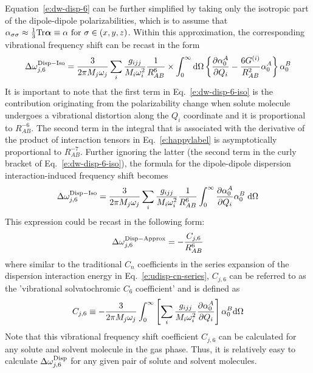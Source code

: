 \documentclass[a4paper,titlepage,twoside,fleqn,12pt]{book}
\newcommand{\BM}[1]{\ensuremath{\mbox{\boldmath${#1}$}}}
\newcommand{\fderiv}[2]{\ensuremath{
\frac{\partial #1}{\partial #2}}}
\begin{document}
\begin{refsection}
Equation~\eqref{e:dw-disp-6} can be further simplified by taking only the isotropic 
part of the dipole\hyp{}dipole polarizabilities, which is to assume that 
$\alpha_{\sigma\sigma} \approx \frac{1}{3}{\rm Tr}{\BM\alpha} \equiv \alpha \text{ for } \sigma \in (x, y, z)$. 
Within this approximation, the corresponding vibrational frequency shift 
can be recast in the form
%
\begin{equation} \label{e:dw-disp-6-iso}
\Delta \omega_{j,6}^{\rm Disp-Iso} = \frac{3}{2\pi M_j\omega_j}
\sum_i \frac{g_{ijj}}{M_i\omega_i^2} 
\frac{1}{R^6_{AB}} \times
\int_{0}^{\infty} {\rm d}\Omega \left\{ 
\frac{\partial \alpha_0^{A}}{\partial Q_i}- 
\frac{6G^{(i)}}{R^2_{AB}} 
\alpha_0^{A}
\right\}
\alpha_0^{B} 
\end{equation}
%
It is important to note that the first term in Eq.~\eqref{e:dw-disp-6-iso} 
is the contribution originating from the polarizability change 
when solute molecule undergoes a vibrational distortion 
along the $Q_i$ coordinate and it is proportional to $R^{-6}_{AB}$. 
The second term in the integral that is associated with the derivative 
of the product of interaction tensors in Eq.~\eqref{e:happylabel}
is asymptotically proportional to $R^{-7}_{AB}$. Further ignoring the latter 
(the second term in the curly bracket of Eq.~\eqref{e:dw-disp-6-iso}), 
the formula for the dipole\hyp{}dipole dispersion interaction\hyp{}induced 
frequency shift becomes
%
\begin{equation} \label{e:dw-disp-6-iso-approx}
\Delta \omega_{j,6}^{\rm Disp-Iso} = \frac{3}{2\pi M_j\omega_j}
\sum_i \frac{g_{ijj}}{M_i\omega_i^2} 
\frac{1}{R^6_{AB}} 
\int_{0}^{\infty} 
\frac{\partial \alpha_0^{A}}{\partial Q_i}
\alpha_0^{B}  \;{\rm d}\Omega  
\end{equation}
%
This expression could be recast in the following form: 
%
\begin{equation} \label{e:dw-disp-6-iso-approx-cj6}
\Delta \omega_{j,6}^{\rm Disp-Approx} = 
 - \frac{C_{j,6}}{R_{AB}^6}
\end{equation}
%
where similar to the traditional $C_n$ coefficients 
in the series expansion of the dispersion interaction 
energy in Eq.~\eqref{e:udisp-cn-series}, $C_{j,6}$ 
can be referred to as 
the 'vibrational solvatochromic $C_6$ coefficient' 
and is defined as
%
\begin{equation} \label{e:cj6}
C_{j,6} \equiv
-\frac{3}{2\pi M_j\omega_j} 
\int_{0}^{\infty} 
\left[
\sum_i \frac{g_{ijj}}{M_i\omega_i^2} 
\fderiv{\alpha_0^{A}}{Q_i}
\right]
\alpha_0^{B} 
{\rm d}\Omega  
\end{equation}
%
Note that this vibrational frequency shift coefficient 
$C_{j,6}$ can be calculated for any solute and solvent 
molecule in the gas phase. Thus, it is relatively easy 
to calculate $\Delta \omega_{j,6}^{\rm Disp}$ for any 
given pair of solute and solvent molecules.


\end{refsection}
\end{document}
